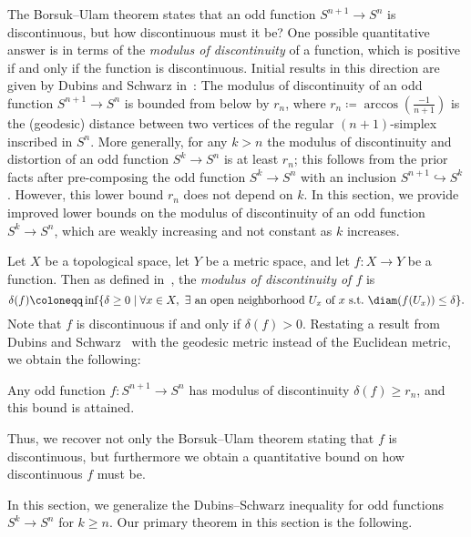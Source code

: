 \documentclass[11pt, reqno, english]{amsart}
\begin{document}
The Borsuk--Ulam theorem states that an odd function $S^{n+1} \to S^n$ is discontinuous, but how discontinuous must it be?
One possible quantitative answer is in terms of the \emph{modulus of discontinuity} of a function, which is positive if and only if the function is discontinuous.
Initial results in this direction are given by Dubins and Schwarz in~\cite[Corollary~3]{dubins1981equidiscontinuity}:
The modulus of discontinuity of an odd function $S^{n+1}\to S^n$ is bounded from below by $r_n$, where $r_n\coloneqq \arccos\left(\tfrac{-1}{n+1}\right)$ is the (geodesic) distance between two vertices of the regular $(n+1)$-simplex inscribed in $S^n$.
More generally, for any $k>n$ the modulus of discontinuity and distortion of an odd function $S^k \to S^n$ is at least $r_n$; this follows from the prior facts after pre-composing the odd function $S^k \to S^n$ with an inclusion $S^{n+1}\hookrightarrow S^k$.
However, this lower bound $r_n$ does not depend on $k$.
In this section, we provide improved lower bounds on the modulus of discontinuity of an odd function $S^k \to S^n$, which are weakly increasing and not constant as $k$ increases.

Let $X$ be a topological space, let $Y$ be a metric space, and let $f\colon X\to Y$ be a function.
Then as defined in~\cite{dubins1981equidiscontinuity}, the \emph{modulus of discontinuity of $f$} is
\[
\delta(f)\coloneqq \inf\{\delta\geq 0 \mid \forall x\in X,\ \exists~\text{an open neighborhood } U_x \text{ of } x \text{ s.t.\ } \diam(f(U_x))\leq \delta\}.
\]
Note that $f$ is discontinuous if and only if $\delta(f)>0$.
Restating a result from Dubins and Schwarz~\cite{dubins1981equidiscontinuity} with the geodesic metric instead of the Euclidean metric, we obtain the following:

\begin{theorem}
\label{thm:ds-inequality}
Any odd function $f\colon S^{n+1} \to S^n$ has modulus of discontinuity $\delta(f)\geq r_n$, and this bound is attained.
\end{theorem}

\noindent Thus, we recover not only the Borsuk--Ulam theorem stating that $f$ is discontinuous, but furthermore we obtain a quantitative bound on how discontinuous $f$ must be.

In this section, we generalize the Dubins--Schwarz inequality for odd functions $S^k \to S^n$ for $k\ge n$.
Our primary theorem in this section is the following.
\end{document}
